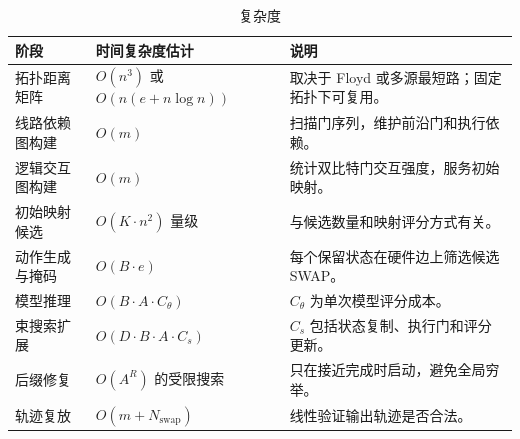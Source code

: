 \begin{table}[H]
  \centering
  \caption{复杂度}
  \label{tab:complexity}
  \begin{tabularx}{\linewidth}{lYY}
    \toprule
    阶段 & 时间复杂度估计 & 说明 \\
    \midrule
    拓扑距离矩阵 & $O(n^3)$ 或 $O(n(e+n\log n))$ & 取决于 Floyd 或多源最短路；固定拓扑下可复用。\\
    线路依赖图构建 & $O(m)$ & 扫描门序列，维护前沿门和执行依赖。\\
    逻辑交互图构建 & $O(m)$ & 统计双比特门交互强度，服务初始映射。\\
    初始映射候选 & $O(K\cdot n^2)$ 量级 & 与候选数量和映射评分方式有关。\\
    动作生成与掩码 & $O(B\cdot e)$ & 每个保留状态在硬件边上筛选候选 SWAP。\\
    模型推理 & $O(B\cdot A\cdot C_\theta)$ & $C_\theta$ 为单次模型评分成本。\\
    束搜索扩展 & $O(D\cdot B\cdot A\cdot C_s)$ & $C_s$ 包括状态复制、执行门和评分更新。\\
    后缀修复 & $O(A^R)$ 的受限搜索 & 只在接近完成时启动，避免全局穷举。\\
    轨迹复放 & $O(m+N_{\mathrm{swap}})$ & 线性验证输出轨迹是否合法。\\
    \bottomrule
  \end{tabularx}
\end{table}
